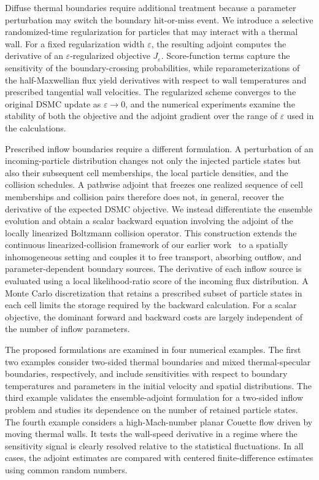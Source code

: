 \documentclass[12pt,nopreprintline]{elsarticle}
\begin{document}
Diffuse thermal boundaries require additional treatment because a parameter perturbation may switch the boundary hit-or-miss event. We introduce a selective randomized-time regularization for particles that may interact with a thermal wall. For a fixed regularization width $\varepsilon$, the resulting adjoint computes the derivative of an $\varepsilon$-regularized objective $J_\varepsilon$. Score-function terms capture the sensitivity of the boundary-crossing probabilities, while reparameterizations of the half-Maxwellian flux yield derivatives with respect to wall temperatures and prescribed tangential wall velocities. The regularized scheme converges to the original DSMC update as $\varepsilon\to0$, and the numerical experiments examine the stability of both the objective and the adjoint gradient over the range of $\varepsilon$ used in the calculations.

Prescribed inflow boundaries require a different formulation. A perturbation of an incoming-particle distribution changes not only the injected particle states but also their subsequent cell memberships, the local particle densities, and the collision schedules. A pathwise adjoint that freezes one realized sequence of cell memberships and collision pairs therefore does not, in general, recover the derivative of the expected DSMC objective. We instead differentiate the ensemble evolution and obtain a scalar backward equation involving the adjoint of the locally linearized Boltzmann collision operator. This construction extends the continuous linearized-collision framework of our earlier work~\cite{caflisch2021adjoint} to a spatially inhomogeneous setting and couples it to free transport, absorbing outflow, and parameter-dependent boundary sources. The derivative of each inflow source is evaluated using a local likelihood-ratio score of the incoming flux distribution. A Monte Carlo discretization that retains a prescribed subset of particle states in each cell limits the storage required by the backward calculation. For a scalar objective, the dominant forward and backward costs are largely independent of the number of inflow parameters.


The proposed formulations are examined in four numerical examples. The first two examples consider two-sided thermal boundaries and mixed thermal-specular boundaries, respectively, and include sensitivities with respect to boundary temperatures and parameters in the initial velocity and spatial distributions. The third example validates the ensemble-adjoint formulation for a two-sided inflow problem and studies its dependence on the number of retained particle states. The fourth example considers a high-Mach-number planar Couette flow driven by moving thermal walls. It tests the wall-speed derivative in a regime where the sensitivity signal is clearly resolved relative to the statistical fluctuations. In all cases, the adjoint estimates are compared with centered finite-difference estimates using common random numbers.
\end{document}
